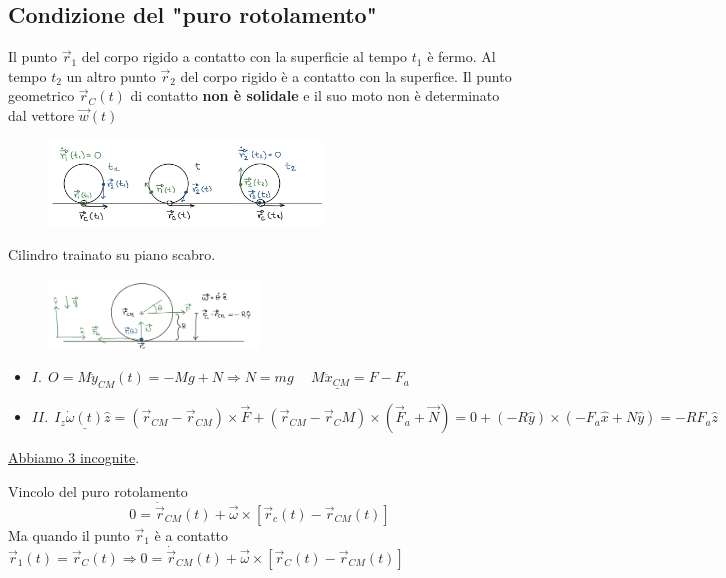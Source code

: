 \subsection{Condizione del "puro rotolamento"}
Il punto $\vec{r}_1$ del corpo rigido a contatto con la superficie al tempo $t_1$ è fermo. Al tempo 
$t_2$ un altro punto $\vec{r}_2$ del corpo rigido è a contatto con la superfice. Il punto geometrico $\vec{r}_C(t)$ di contatto 
\textbf{non è solidale} e il suo moto non è determinato dal vettore $\vec{w}(t)$
\begin{figure}[h!]
    \centering
    \includegraphics[width=0.65\textwidth]{images/puro-rotolamento.png}
\end{figure}
\begin{example}
    Cilindro trainato su piano scabro.
    \begin{figure}[h!]
        \centering
        \includegraphics[width=0.50\textwidth]{images/cilindro-trainato-piano-scabro.png}
    \end{figure}
    \begin{itemize}
        \item $I. \:\: O = M\ddot{y}_{CM}(t) = -Mg + N \Rightarrow N = mg \hspace{15pt} M\underline{\ddot{x}_{CM}} = F - F_a$
        \item $II. \:\: I_z\underline{\dot{\omega}(t)}\hat{z} = (\vec{r}_{CM} - \vec{r}_{CM}) \times \vec{F} + (\vec{r}_{CM} - \vec{r}_CM) \times (\vec{F}_a + \vec{N}) = 0 + (-R\hat{y}) \times (-F_a\hat{x} + N\hat{y}) = -RF_a\hat{z}$
    \end{itemize}
    \underline{Abbiamo 3 incognite}.
\end{example}
\hspace{-15pt}Vincolo del puro rotolamento
$$0 = \dot{\vec{r}}_{CM}(t) + \vec{\omega} \times [\vec{r}_c(t) - \vec{r}_{CM}(t)]$$
Ma quando il punto $\vec{r}_1$ è a contatto $\vec{r}_1(t) = \vec{r}_C(t) \Rightarrow 0 = \dot{\vec{r}}_{CM}(t) + \vec{\omega} \times [\vec{r}_C(t) - \vec{r}_{CM}(t)]$ 
